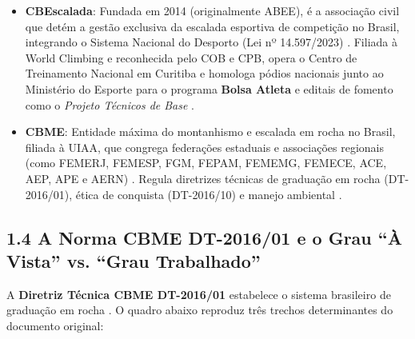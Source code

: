 \begin{itemize}
    \item \textbf{CBEscalada}: Fundada em 2014 (originalmente ABEE), é a associação civil que detém a gestão exclusiva da escalada esportiva de competição no Brasil, integrando o Sistema Nacional do Desporto (Lei nº 14.597/2023) \cite{cbescalada_sobre}. Filiada à World Climbing e reconhecida pelo COB e CPB, opera o Centro de Treinamento Nacional em Curitiba e homologa pódios nacionais junto ao Ministério do Esporte para o programa \textbf{Bolsa Atleta} e editais de fomento como o \textit{Projeto Técnicos de Base} \cite{cbescalada_sobre, cbescalada_filiacoes}.
    \item \textbf{CBME}: Entidade máxima do montanhismo e escalada em rocha no Brasil, filiada à UIAA, que congrega federações estaduais e associações regionais (como FEMERJ, FEMESP, FGM, FEPAM, FEMEMG, FEMECE, ACE, AEP, APE e AERN) \cite{cbme_dt01}. Regula diretrizes técnicas de graduação em rocha (DT-2016/01), ética de conquista (DT-2016/10) e manejo ambiental \cite{cbme_dt01, cbme_dt10}.
\end{itemize}

\subsection*{1.4 A Norma CBME DT-2016/01 e o Grau ``À Vista'' vs. ``Grau Trabalhado''}

A \textbf{Diretriz Técnica CBME DT-2016/01} estabelece o sistema brasileiro de graduação em rocha \cite{cbme_dt01}. O quadro abaixo reproduz três trechos determinantes do documento original:

